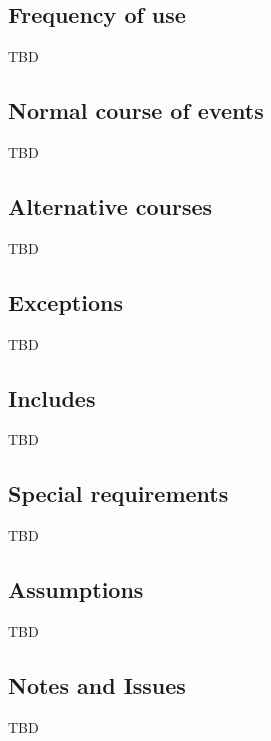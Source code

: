 \documentclass[a4paper]{article}
\begin{document}
\subsection{Frequency of use}
TBD
\subsection{Normal course of events}
TBD
\subsection{Alternative courses}
TBD
\subsection{Exceptions}
TBD
\subsection{Includes}
TBD
\subsection{Special requirements}
TBD
\subsection{Assumptions}
TBD
\subsection{Notes and Issues}
TBD
\end{document}
